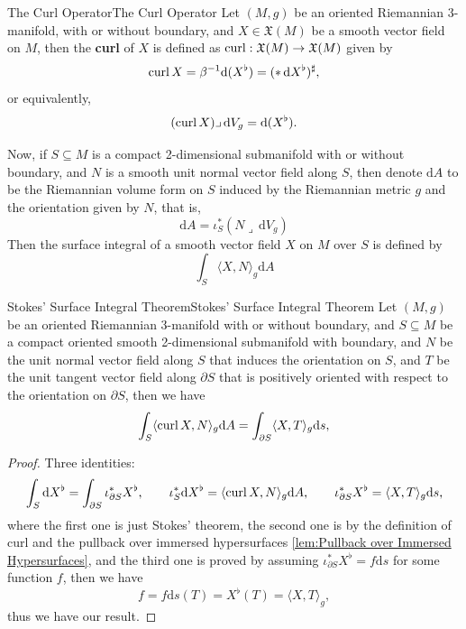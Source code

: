 \documentclass[../main.tex]{subfiles}
\begin{document}
\begin{definition}{The Curl Operator}{The Curl Operator}
  Let $(M,g)$ be an oriented Riemannian 3-manifold, with or without boundary, and $X \in \mathfrak{X}(M)$ be a smooth vector field on $M$, then the \textbf{curl} of $X$ is defined as $\operatorname{curl}: \mathfrak{X}(M) \to \mathfrak{X}(M)$ given by
  \begin{equation}
    \operatorname{curl} X = \beta^{-1} \mathrm{d} (X^\flat) = (* \, \mathrm{d} X^\flat)^\sharp,
  \end{equation}
  or equivalently,
  \begin{equation*}
    (\operatorname{curl} X) \lrcorner \, \mathrm{d} V_g = \mathrm{d} (X^\flat).
  \end{equation*}
\end{definition}
Now, if $S \subseteq M$ is a compact 2-dimensional submanifold with or without boundary, and $N$ is a smooth unit normal vector field along $S$, then denote $\mathrm{d} A$ to be the Riemannian volume form on $S$ induced by the Riemannian metric $g$ and the orientation given by $N$, that is,
\begin{equation*}
  \mathrm{d} A = \iota_S^* (N \lrcorner \, \mathrm{d} V_g)
\end{equation*}
Then the surface integral of a smooth vector field $X$ on $M$ over $S$ is defined by
\begin{equation}
  \int_S \langle X, N \rangle_g \mathrm{d} A
\end{equation}

\begin{theorem}{Stokes' Surface Integral Theorem}{Stokes' Surface Integral Theorem}
  Let $(M,g)$ be an oriented Riemannian 3-manifold with or without boundary, and $S \subseteq M$ be a compact oriented smooth 2-dimensional submanifold with boundary, and $N$ be the unit normal vector field along $S$ that induces the orientation on $S$, and $T$ be the unit tangent vector field along $\partial S$ that is positively oriented with respect to the orientation on $\partial S$, then we have
  \begin{equation}
    \int_S \langle \operatorname{curl} X, N \rangle_g \mathrm{d} A = \int_{\partial S} \langle X, T \rangle_g \mathrm{d} s,
  \end{equation}
\end{theorem}
\begin{proof}
  Three identities:
  \begin{equation*}
    \int_S \mathrm{d} X^\flat = \int_{\partial S} \iota^*_{\partial S} X^\flat, \qquad \iota_S^* \mathrm{d} X^\flat = \langle \operatorname{curl} X, N \rangle_g \mathrm{d} A, \qquad \iota^*_{\partial S} X^\flat = \langle X, T \rangle_g \mathrm{d} s,
  \end{equation*}
  where the first one is just Stokes' theorem, the second one is by the definition of curl and the pullback over immersed hypersurfaces \ref{lem:Pullback over Immersed Hypersurfaces}, and the third one is proved by assuming $\iota_{\partial S}^* X^\flat = f \mathrm{d} s$ for some function $f$, then we have
  \begin{equation*}
    f = f \mathrm{d} s(T) = X^\flat (T) = \langle X, T \rangle_g,
  \end{equation*}
  thus we have our result.
\end{proof}
\end{document}
